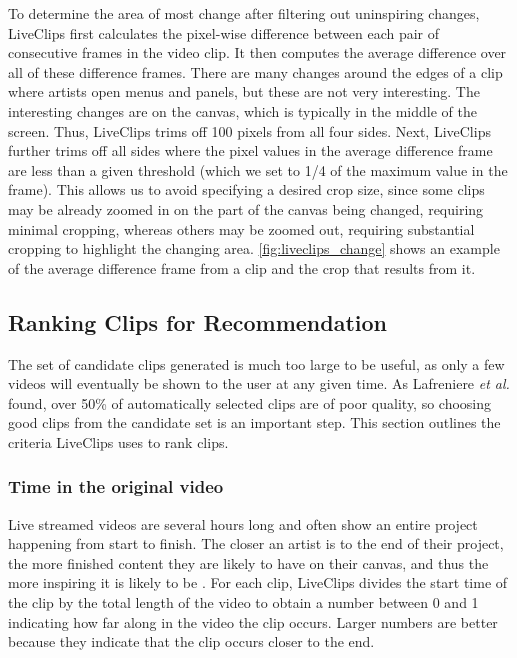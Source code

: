 To determine the area of most change after filtering out uninspiring changes, LiveClips first calculates the pixel-wise difference between each pair of consecutive frames in the video clip. It then computes the average difference over all of these difference frames. There are many changes around the edges of a clip where artists open menus and panels, but these are not very interesting. The interesting changes are on the canvas, which is typically in the middle of the screen. Thus, LiveClips trims off 100 pixels from all four sides. Next, LiveClips further trims off all sides where the pixel values in the average difference frame are less than a given threshold (which we set to 1/4 of the maximum value in the frame). This allows us to avoid specifying a desired crop size, since some clips may be already zoomed in on the part of the canvas being changed, requiring minimal cropping, whereas others may be zoomed out, requiring substantial cropping to highlight the changing area. \autoref{fig:liveclips_change} shows an example of the average difference frame from a clip and the crop that results from it.

\subsection{Ranking Clips for Recommendation}
The set of candidate clips generated is much too large to be useful, as only a few videos will eventually be shown to the user at any given time. As Lafreniere \textit{et al.} \cite{Lafreniere2014} found, over 50\% of automatically selected clips are of poor quality, so choosing good clips from the candidate set is an important step. This section outlines the criteria LiveClips uses to rank clips.

\subsubsection{Time in the original video}
Live streamed videos are several hours long and often show an entire project happening from start to finish. The closer an artist is to the end of their project, the more finished content they are likely to have on their canvas, and thus the more inspiring it is likely to be%
. For each clip, LiveClips divides the start time of the clip by the total length of the video to obtain a number between 0 and 1 indicating how far along in the video the clip occurs. Larger numbers are better because they indicate that the clip occurs closer to the end.


